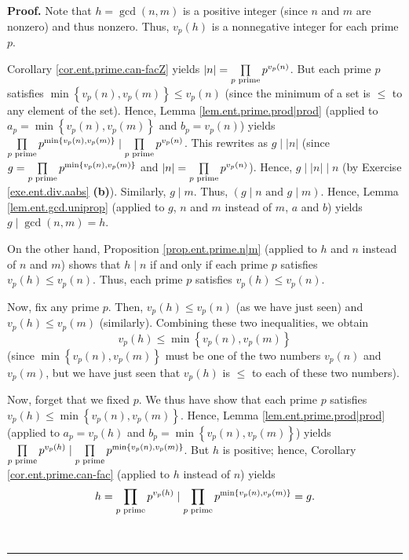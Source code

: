 \documentclass[numbers=enddot,12pt,final,onecolumn,notitlepage]{scrartcl}%
\numberwithin{exer}{subsection}
\theoremstyle{definition}
\newenvironment{proof}[1][Proof]{\noindent\textbf{#1.} }{\ \rule{0.5em}{0.5em}}
\let\prodnonlimits\prod
\renewcommand{\prod}{\prodnonlimits\limits}
\begin{document}
\begin{proof}
Note that $h=\gcd\left(  n,m\right)  $ is a positive integer (since $n$ and
$m$ are nonzero) and thus nonzero. Thus, $v_{p}\left(  h\right)  $ is a
nonnegative integer for each prime $p$.

Corollary \ref{cor.ent.prime.can-facZ} yields $\left\vert n\right\vert
=\prod\limits_{p\text{ prime}}p^{v_{p}\left(  n\right)  }$. But each prime $p$
satisfies \newline$\min\left\{  v_{p}\left(  n\right)  ,v_{p}\left(  m\right)
\right\}  \leq v_{p}\left(  n\right)  $ (since the minimum of a set is $\leq$
to any element of the set). Hence, Lemma \ref{lem.ent.prime.prod|prod}
(applied to $a_{p}=\min\left\{  v_{p}\left(  n\right)  ,v_{p}\left(  m\right)
\right\}  $ and $b_{p}=v_{p}\left(  n\right)  $) yields $\prod\limits_{p\text{
prime}}p^{\min\left\{  v_{p}\left(  n\right)  ,v_{p}\left(  m\right)
\right\}  }\mid\prod\limits_{p\text{ prime}}p^{v_{p}\left(  n\right)  }$. This
rewrites as $g\mid\left\vert n\right\vert $ (since $g=\prod\limits_{p\text{
prime}}p^{\min\left\{  v_{p}\left(  n\right)  ,v_{p}\left(  m\right)
\right\}  }$ and $\left\vert n\right\vert =\prod\limits_{p\text{ prime}%
}p^{v_{p}\left(  n\right)  }$). Hence, $g\mid\left\vert n\right\vert \mid n$
(by Exercise \ref{exe.ent.div.aabs} \textbf{(b)}). Similarly, $g\mid m$. Thus,
$\left(  g\mid n\text{ and }g\mid m\right)  $. Hence, Lemma
\ref{lem.ent.gcd.uniprop} (applied to $g$, $n$ and $m$ instead of $m$, $a$ and
$b$) yields $g\mid\gcd\left(  n,m\right)  =h$.

On the other hand, Proposition \ref{prop.ent.prime.n|m} (applied to $h$ and
$n$ instead of $n$ and $m$) shows that $h\mid n$ if and only if each prime $p$
satisfies $v_{p}\left(  h\right)  \leq v_{p}\left(  n\right)  $. Thus, each
prime $p$ satisfies $v_{p}\left(  h\right)  \leq v_{p}\left(  n\right)  $.

Now, fix any prime $p$. Then, $v_{p}\left(  h\right)  \leq v_{p}\left(
n\right)  $ (as we have just seen) and $v_{p}\left(  h\right)  \leq
v_{p}\left(  m\right)  $ (similarly). Combining these two inequalities, we
obtain%
\[
v_{p}\left(  h\right)  \leq\min\left\{  v_{p}\left(  n\right)  ,v_{p}\left(
m\right)  \right\}
\]
(since $\min\left\{  v_{p}\left(  n\right)  ,v_{p}\left(  m\right)  \right\}
$ must be one of the two numbers $v_{p}\left(  n\right)  $ and $v_{p}\left(
m\right)  $, but we have just seen that $v_{p}\left(  h\right)  $ is $\leq$ to
each of these two numbers).

Now, forget that we fixed $p$. We thus have show that each prime $p$ satisfies
$v_{p}\left(  h\right)  \leq\min\left\{  v_{p}\left(  n\right)  ,v_{p}\left(
m\right)  \right\}  $. Hence, Lemma \ref{lem.ent.prime.prod|prod} (applied to
$a_{p}=v_{p}\left(  h\right)  $ and $b_{p}=\min\left\{  v_{p}\left(  n\right)
,v_{p}\left(  m\right)  \right\}  $) yields $\prod\limits_{p\text{ prime}%
}p^{v_{p}\left(  h\right)  }\mid\prod\limits_{p\text{ prime}}p^{\min\left\{
v_{p}\left(  n\right)  ,v_{p}\left(  m\right)  \right\}  }$. But $h$ is
positive; hence, Corollary \ref{cor.ent.prime.can-fac} (applied to $h$ instead
of $n$) yields%
\[
h=\prod\limits_{p\text{ prime}}p^{v_{p}\left(  h\right)  }\mid\prod
\limits_{p\text{ prime}}p^{\min\left\{  v_{p}\left(  n\right)  ,v_{p}\left(
m\right)  \right\}  }=g.
\]



\end{proof}
\end{document}
